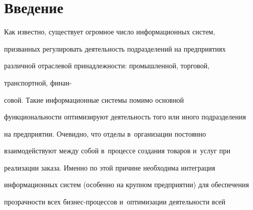 












      \thispagestyle{headings}

      

      \vspace*{-9pt} 



\section{Введение}






  Как известно, существует огромное число информационных систем, 

призванных регулировать деятельность подразделений на предприятиях 

различной отрас\-ле\-вой принадлежности: промышленной, торговой, 

транспортной, финан-\linebreak\vspace*{-12pt}



\pagebreak



\noindent

совой. Такие информационные системы помимо основной 

функциональности оптимизируют деятельность того или иного подразделения 

на предприятии. Очевидно, что отделы в~организации постоянно 

взаимодействуют между собой в~процессе создания товаров и~услуг при 

реализации заказа. Именно по этой причине необходима интеграция 

информационных систем (особенно на крупном предприятии) для обеспечения 

прозрачности всех бизнес-процессов и~оптимизации деятельности всей 

